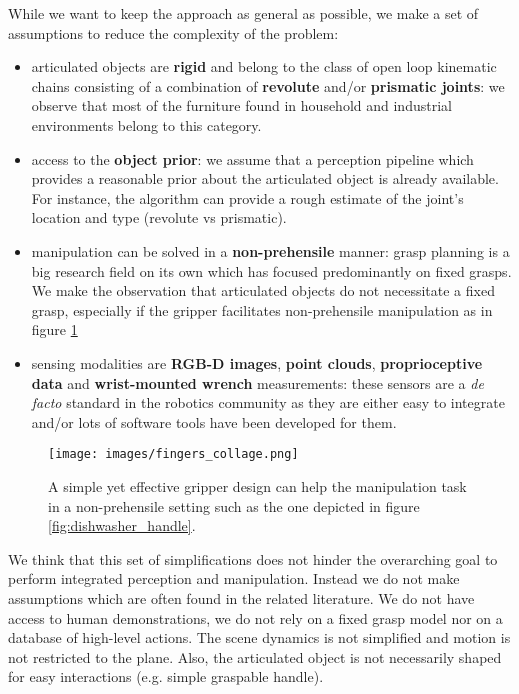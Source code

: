 While we want to keep the approach as general as possible, we make a set of assumptions to reduce the complexity of the problem:  
\begin{itemize}
\item articulated objects are \textbf{rigid} and belong to the class of open loop kinematic chains consisting of a combination of \textbf{revolute} and/or \textbf{prismatic joints}: we observe that most of the furniture found in household and industrial environments belong to this category.  
\item access to the \textbf{object prior}: we assume that a perception pipeline which provides a reasonable prior about the articulated object is already available. For instance, the algorithm can provide a rough estimate of the joint's location and type (revolute vs prismatic). 
\item manipulation can be solved in a \textbf{non-prehensile} manner: grasp planning is a big research field on its own which has focused predominantly on fixed grasps. We make the observation that articulated objects do not necessitate a fixed grasp, especially if the gripper facilitates non-prehensile manipulation as in figure \ref{fig:hook_gripper} 
\item sensing modalities are \textbf{RGB-D images}, \textbf{point clouds}, \textbf{proprioceptive data} and \textbf{wrist-mounted wrench} measurements: these sensors are a \emph{de facto} standard in the robotics community as they are either easy to integrate and/or lots of software tools have been developed for them.
\end{itemize}

\begin{figure}[t]
    \centering
    \texttt{[image: images/fingers\_collage.png]}
    \caption{A simple yet effective gripper design can help the manipulation task in a non-prehensile setting such as the one depicted in figure \ref{fig:dishwasher_handle}.}
    \label{fig:hook_gripper}
\end{figure}

We think that this set of simplifications does not hinder the overarching goal to perform integrated perception and manipulation. Instead we do not make assumptions which are often found in the related literature. We do not have access to human demonstrations, we do not rely on a fixed grasp model nor on a database of high-level actions. The scene dynamics is not simplified and motion is not restricted to the plane. Also, the articulated object is not necessarily shaped for easy interactions (e.g. simple graspable handle). 

